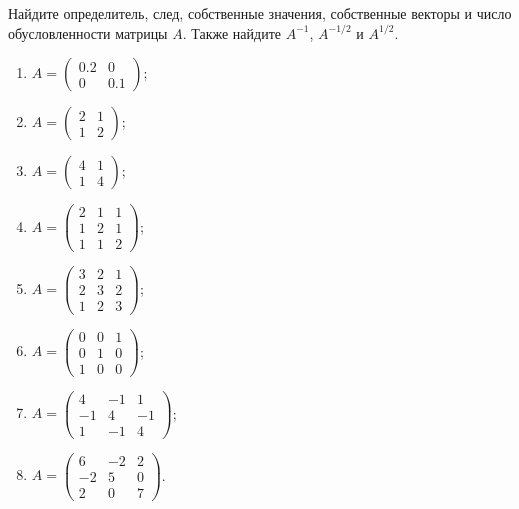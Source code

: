 \begin{problem}
Найдите определитель, след, собственные значения, собственные векторы и число
обусловленности матрицы $A$. Также найдите $A^{-1}$, $A^{-1/2}$ и $A^{1/2}$.
\begin{enumerate}
\item $A=\begin{pmatrix}
0.2 & 0 \\
0 & 0.1
\end{pmatrix}$;
\item $A=\begin{pmatrix}
2 & 1 \\
1 & 2
\end{pmatrix}$;

\item $A=\begin{pmatrix}
4 & 1 \\
1 & 4
\end{pmatrix}$;

\item $A=\begin{pmatrix}
2 & 1 & 1 \\
1 & 2 & 1 \\
1 & 1 & 2
\end{pmatrix}$;

\item $A=\begin{pmatrix}
3 & 2 & 1 \\
2 & 3 & 2 \\
1 & 2 & 3
\end{pmatrix}$;

\item $A=\begin{pmatrix}
0 & 0 & 1 \\
0 & 1 & 0 \\
1 & 0 & 0
\end{pmatrix}$;

\item $A=\begin{pmatrix}
4 & -1 & 1 \\
-1 & 4 & -1 \\
1 & -1 & 4
\end{pmatrix}$;

\item $A=\begin{pmatrix}
6 & -2 & 2 \\
-2 & 5 & 0 \\
2 & 0 & 7
\end{pmatrix}$.
\end{enumerate}


\begin{sol}
\end{sol}
\end{problem}



